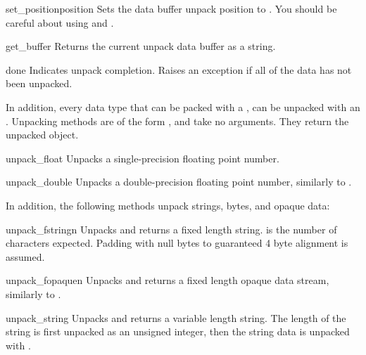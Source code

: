 \begin{methoddesc}[Unpacker]{set_position}{position}
Sets the data buffer unpack position to .  You should be
careful about using  and .
\end{methoddesc}

\begin{methoddesc}[Unpacker]{get_buffer}{}
Returns the current unpack data buffer as a string.
\end{methoddesc}

\begin{methoddesc}[Unpacker]{done}{}
Indicates unpack completion.  Raises an  exception
if all of the data has not been unpacked.
\end{methoddesc}

In addition, every data type that can be packed with a ,
can be unpacked with an .  Unpacking methods are of the
form , and take no arguments.  They return the
unpacked object.

\begin{methoddesc}[Unpacker]{unpack_float}{}
Unpacks a single-precision floating point number.
\end{methoddesc}

\begin{methoddesc}[Unpacker]{unpack_double}{}
Unpacks a double-precision floating point number, similarly to
.
\end{methoddesc}

In addition, the following methods unpack strings, bytes, and opaque
data:

\begin{methoddesc}[Unpacker]{unpack_fstring}{n}
Unpacks and returns a fixed length string.   is the number of
characters expected.  Padding with null bytes to guaranteed 4 byte
alignment is assumed.
\end{methoddesc}

\begin{methoddesc}[Unpacker]{unpack_fopaque}{n}
Unpacks and returns a fixed length opaque data stream, similarly to
.
\end{methoddesc}

\begin{methoddesc}[Unpacker]{unpack_string}{}
Unpacks and returns a variable length string.  The length of the
string is first unpacked as an unsigned integer, then the string data
is unpacked with .
\end{methoddesc}

